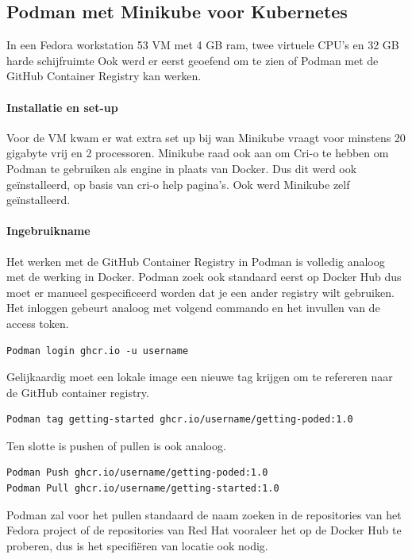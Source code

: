 \subsection{Podman met Minikube voor Kubernetes}
In een Fedora workstation 53 VM met 4 GB ram, twee virtuele CPU’s en 32 GB harde schijfruimte Ook werd er eerst geoefend om te zien of Podman met de GitHub Container Registry kan werken.
\paragraph{Installatie en set-up}
Voor de VM kwam er wat extra set up bij wan Minikube vraagt voor minstens 20 gigabyte vrij en 2 processoren.
Minikube raad ook aan om Cri-o te hebben om Podman te gebruiken als engine in plaats van Docker. Dus dit werd ook geïnstalleerd, op basis van cri-o help pagina’s.  Ook werd Minikube zelf geïnstalleerd.

\paragraph{Ingebruikname}
Het werken met de GitHub Container Registry in Podman is volledig analoog met de werking in Docker. Podman zoek ook standaard eerst op Docker Hub dus moet er manueel gespecificeerd worden dat je een ander registry wilt gebruiken. Het inloggen gebeurt analoog met volgend commando en het invullen van de access token.
\begin{verbatim}
Podman login ghcr.io -u username
\end{verbatim}

Gelijkaardig moet een lokale image een nieuwe tag krijgen om te refereren naar de GitHub container registry.
\begin{verbatim}
Podman tag getting-started ghcr.io/username/getting-poded:1.0
\end{verbatim}

Ten slotte is pushen of pullen is ook analoog.
\begin{verbatim}
Podman Push ghcr.io/username/getting-poded:1.0
Podman Pull ghcr.io/username/getting-started:1.0
\end{verbatim}

Podman zal voor het pullen standaard de naam zoeken in de repositories van het Fedora project of de repositories van Red Hat vooraleer het op de Docker Hub te proberen, dus is het specifiëren van locatie ook nodig.

